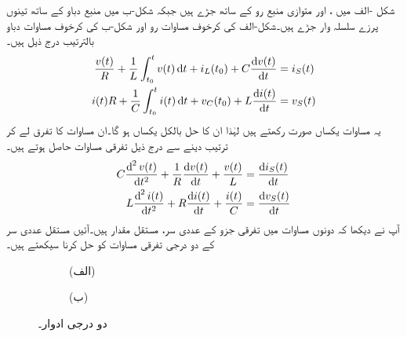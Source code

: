 شکل -الف میں ،  اور  متوازی منبع رو  کے ساتھ جڑے ہیں جبکہ شکل-ب میں منبع دباو کے ساتھ تینوں پرزے سلسلہ وار جڑے ہیں۔شکل-الف کی کرخوف مساوات رو اور شکل-ب کی کرخوف مساوات دباو بالترتیب درج ذیل ہیں۔
\begin{align*}
\frac{v(t)}{R}+\frac{1}{L}\int_{t_0}^{t} v(t)\dif t+i_L(t_0)+ C\frac{\dif v(t)}{\dif t}&=i_S(t)\\
i(t) R+\frac{1}{C}\int_{t_0}^{t} i(t)\dif t+v_C(t_0)+L \frac{\dif i(t)}{\dif t}&=v_S(t)
\end{align*}
یہ مساوات یکساں صورت رکھتے ہیں لہٰذا ان کا حل بالکل یکساں ہو گا۔ان مساوات کا تفرق لے کر ترتیب دینے سے درج ذیل تفرقی مساوات حاصل ہوتے ہیں۔
\begin{align*}
C\frac{\dif^{\,2} v(t)}{\dif t^2}+\frac{1}{R}\frac{\dif v(t)}{\dif t}+\frac{v(t)}{L}&=\frac{\dif i_S(t)}{\dif t}\\
L\frac{\dif^{\,2} i(t)}{\dif t^2}+R\frac{\dif i(t)}{\dif t}+\frac{i(t)}{C}&=\frac{\dif v_S(t)}{\dif t}
\end{align*}
آپ نے دیکھا کہ دونوں مساوات میں تفرقی جزو کے عددی سر، مستقل مقدار ہیں۔آئیں مستقل عددی سر کے دو درجی تفرقی مساوات کو حل کرنا سیکھتے ہیں۔
 \begin{figure}
\centering
\begin{subfigure}{0.5\textwidth}
\centering
{}%
\caption*{(الف)}
\end{subfigure}
\begin{subfigure}{0.5\textwidth}
\centering
{}%
\caption*{(ب)}
\end{subfigure}
\caption{دو درجی ادوار۔}
\label{شکل_عارضی_دو_درجی_ادوار}
\end{figure}

